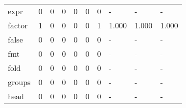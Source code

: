 \begin{longtable}{lp{1.3cm}p{1.3cm}p{1.3cm}p{1.3cm}p{1.3cm}p{1.3cm}p{1.3cm}p{1.3cm}p{1.3cm}}
expr      &                      0 &                                             0 &                                            0 &                                           0 &                                            0 &                                          0 &                                    - &                                      - &                                    - \\
factor    &                      1 &                                             0 &                                            0 &                                           0 &                                            0 &                                          1 &                                1.000 &                                  1.000 &                                1.000 \\
false     &                      0 &                                             0 &                                            0 &                                           0 &                                            0 &                                          0 &                                    - &                                      - &                                    - \\
fmt       &                      0 &                                             0 &                                            0 &                                           0 &                                            0 &                                          0 &                                    - &                                      - &                                    - \\
fold      &                      0 &                                             0 &                                            0 &                                           0 &                                            0 &                                          0 &                                    - &                                      - &                                    - \\
groups    &                      0 &                                             0 &                                            0 &                                           0 &                                            0 &                                          0 &                                    - &                                      - &                                    - \\
head      &                      0 &                                             0 &                                            0 &                                           0 &                                            0 &                                          0 &                                    - &                                      - &                                    - \\

\end{longtable}
